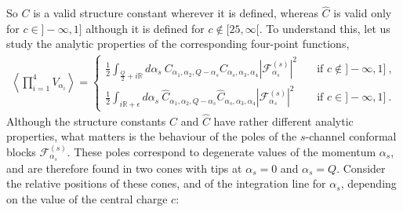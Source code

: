 \documentclass[12pt, a4paper, notitlepage, twoside]{report}
\numberwithin{equation}{section}
\theoremstyle{break}
\begin{document}
So $C$ is a valid structure constant wherever it is defined, whereas $\hat C$ is valid only for $c\in ]-\infty, 1]$ although it is defined for $c\notin [25,\infty[$.
To understand this, let us study the analytic properties of the corresponding four-point functions,
\begin{align}
 \left< \prod_{i=1}^4 V_{\alpha_i}\right> = 
 \left\{\begin{array}{ll} 
         \frac12 \int_{\frac{Q}{2}+i\mathbb{R}} d\alpha_s\ C_{\alpha_1,\alpha_2,Q-\alpha_s} C_{\alpha_s,\alpha_3, \alpha_4} \left|\mathcal{F}_{\alpha_s}^{(s)} \right|^2 \quad & \text{if } c\notin ]-\infty, 1]\ ,
         \\
         \frac12 \int_{i\mathbb{R}+\epsilon} d\alpha_s\ \hat C_{\alpha_1,\alpha_2,Q-\alpha_s} \hat C_{\alpha_s,\alpha_3, \alpha_4} \left|\mathcal{F}_{\alpha_s}^{(s)} \right|^2 \quad & \text{if } c\in ]-\infty, 1]\ .
        \end{array}
 \right.
\end{align}
Although the structure constants $C$ and $\hat C$ have rather different analytic properties, what matters is the behaviour of the poles of the $s$-channel conformal blocks $\mathcal{F}_{\alpha_s}^{(s)}$. 
These poles correspond to degenerate values of the momentum $\alpha_s$, and are therefore found in two cones with tips at $\alpha_s= 0$ and $\alpha_s = Q$. 
Consider the relative positions of these cones, and of the integration line for $\alpha_s$, depending on the value of the central charge $c$:
\end{document}
